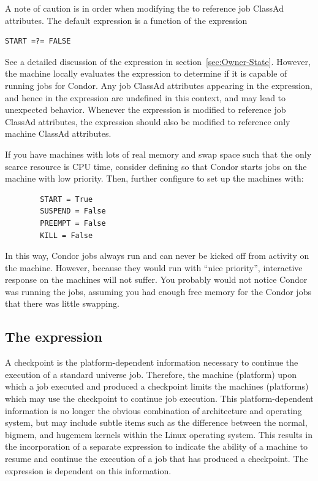 A note of caution is in order when modifying the  to
reference job ClassAd attributes.  The default 
expression is a function of the  expression
\begin{verbatim}
START =?= FALSE
\end{verbatim}
See a detailed discussion of the  expression in
section~\ref{sec:Owner-State}.  However, the machine locally
evaluates the  expression to determine if it is
capable of running jobs for Condor.  Any job ClassAd attributes
appearing in the  expression, and hence in the
 expression are undefined in this context, and may
lead to unexpected behavior.  Whenever the  expression
is modified to reference job ClassAd attributes, the
 expression should also be modified to reference
only machine ClassAd attributes.

\Note If you have machines with lots of real memory and swap space such
that the only scarce resource is CPU time, consider
defining  
so that Condor starts jobs on the machine with low priority.
Then, further configure to set up the machines with:
\begin{verbatim}
        START = True
        SUSPEND = False
        PREEMPT = False
        KILL = False
\end{verbatim}
In this way, Condor jobs always run and can never be kicked off
from activity on the machine. 
However, because they would run with ``nice priority'', interactive 
response on the machines will not suffer.
You probably would not notice Condor was running the jobs, 
assuming you had enough free memory for the Condor jobs that there
was little swapping.

\subsection{\label{sec:Is-Valid-Checkpoint-Platform}The  expression}

A checkpoint is the platform-dependent information necessary
to continue the execution of a standard universe job.
Therefore, the machine (platform) upon which a job executed
and produced a checkpoint limits the machines (platforms)
which may use the checkpoint to continue job execution.
This platform-dependent information is no longer
the obvious combination of architecture and operating system, 
but may include subtle items such as the 
difference between the normal, bigmem, and hugemem kernels
within the Linux operating system.
This results in the incorporation of a separate
expression to indicate the ability of a machine to
resume and continue the execution of a job that has produced
a checkpoint.
The  expression is dependent on this information.

